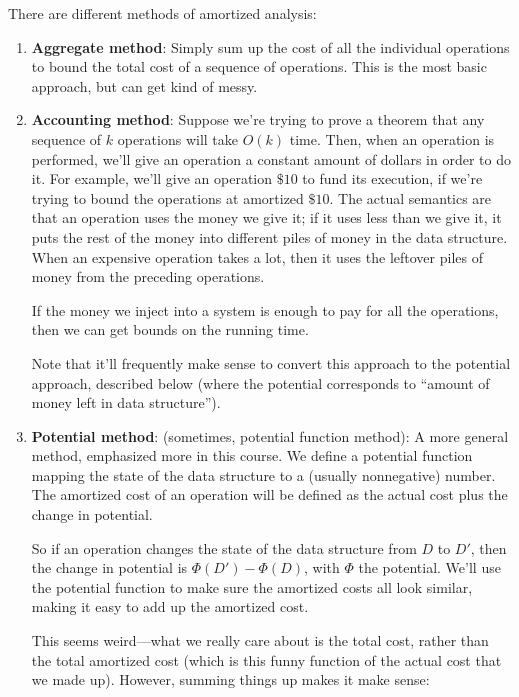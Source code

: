 \documentclass{article}
\begin{document}
There are different methods of amortized analysis:
\begin{enumerate}

	\item 
	\textbf{Aggregate method}:
	Simply sum up the cost of all the individual operations to bound the total
	cost of a sequence of operations.
	This is the most basic approach, but can get kind of messy.
	
	\item
	\textbf{Accounting method}: 
	Suppose we're trying to prove a theorem that any sequence of $k$ 
	operations
	will take $O(k)$ time.
	Then, when an operation is performed, we'll 
	give an operation a constant amount of dollars in order to do it. 
	For example, we'll
	give an operation $\$10$ to fund its execution, if we're trying to bound
	the operations at amortized $\$10$.
	The actual semantics are that an operation uses the money we give it; if
	it uses less than we give it, it puts the rest of the money into different
	piles of money in the data structure.
	When an expensive operation takes a lot, then it uses the leftover piles
	of money from the preceding operations.
	
	If the money we inject into a system is enough to pay for all the 
	operations,
	then we can get bounds on the running time.
	
	Note that it'll frequently make sense to convert this approach
	to the potential approach, described below (where the potential
	corresponds to ``amount of money left in data structure'').
	
	\item
	\textbf{Potential method}: (sometimes, potential function method):
	A more general method, emphasized more in this course.
	We define a potential function mapping the state of the 
	data structure to a (usually nonnegative) number.
	The amortized cost of an operation will be defined as the actual cost plus
	the change in potential.
	
	So if an operation changes the state of the data structure from
	$D$ to $D'$, then the change in potential is $\Phi(D') - \Phi(D)$, with
	$\Phi$ the potential.
	We'll use the potential function to make sure the amortized costs all
	look similar, making it easy to add up the amortized cost.
	
	This seems weird---what we really care about is the total cost, rather
	than the total amortized cost (which is this funny function of the
	actual cost that we made up).
	However, summing things up makes it make sense:
	

\end{enumerate}
\end{document}
